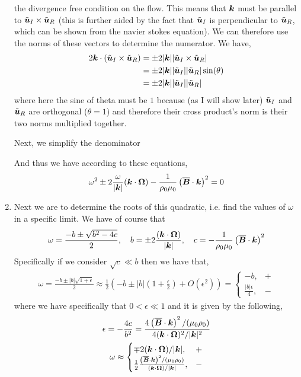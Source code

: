 \documentclass{article}
\begin{document}
\begin{enumerate}[label=\alph*.)]
    the divergence free condition on the flow. This means that $\boldsymbol{k}$ must be
    parallel to $\tilde{\boldsymbol{u}}_I\times\tilde{\boldsymbol{u}}_R$ (this is further aided by the fact that
    $\tilde{\boldsymbol{u}}_I$ is perpendicular to $\tilde{\boldsymbol{u}}_R$, which can be shown from the navier
    stokes equation). We can therefore use the norms of these vectors to
    determine the numerator. We have, 
    \begin{align*}
        2\boldsymbol{k}\cdot(\tilde{\boldsymbol{u}}_I\times\tilde{\boldsymbol{u}}_R) &= \pm 2|\boldsymbol{k}||\tilde{\boldsymbol{u}}_I\times\tilde{\boldsymbol{u}}_R|\\
        &= \pm2|\boldsymbol{k}||\tilde{\boldsymbol{u}}_I||\tilde{\boldsymbol{u}}_R|\sin(\theta)\\
        &= \pm2|\boldsymbol{k}||\tilde{\boldsymbol{u}}_I||\tilde{\boldsymbol{u}}_R|
    \end{align*}
    where here the sine of theta must be $1$ because (as I will show later)
    $\tilde{\boldsymbol{u}}_I$ and $\tilde{\boldsymbol{u}}_R$ are orthogonal ($\theta = 1$) and therefore their cross
    product's norm is their two norms multiplied together. 
    
    Next, we simplify the denominator

    And thus we have according to these equations, 
    \begin{gather*}
        \omega^2 \pm 2\frac{\omega}{|\boldsymbol{k}|}(\boldsymbol{k}\cdot\boldsymbol{\Omega}) 
        - \frac{1}{\rho_0\mu_0}\left(\overline{\boldsymbol{B}}\cdot\boldsymbol{k}\right)^2
        = 0
    \end{gather*}

    \item Next we are to determine the roots of this quadratic, i.e. find the
    values of $\omega$ in a specific limit. We have of course that 
    \begin{gather*}
        \omega = \frac{-b \pm \sqrt{b^2 - 4c}}{2}, \quad b = \pm
        2\frac{(\boldsymbol{k}\cdot\boldsymbol{\Omega})}{|\boldsymbol{k}|}, \quad c = -\frac{1}{\rho_0\mu_0}\left(\overline{\boldsymbol{B}}\cdot\boldsymbol{k}\right)^2
    \end{gather*}
    Specifically if we consider $\sqrt{c} \ll b$ then we have that,
    \begin{gather*}
        \omega = \frac{-b \pm |b|\sqrt{1 + \epsilon}}{2} \approx
        \frac{1}{2}\left(-b \pm |b|\left(1 + \frac{\epsilon}{2}\right) +
        O(\epsilon^2)\right) =  \begin{cases} -b, & +\\
        \frac{|b|\epsilon}{4}, & -
        \end{cases}
    \end{gather*}
    where we have specifically that $0<\epsilon \ll 1$ and it is given by the
    following, 
    \begin{gather*}
        \epsilon = -\frac{4c}{b^2} =
        \frac{4\left(\overline{\boldsymbol{B}}\cdot\boldsymbol{k}\right)^2/(\mu_0\rho_0)}{4(\boldsymbol{k}\cdot\boldsymbol{\Omega})^2/|\boldsymbol{k}|^2}\\
        \omega \approx  \begin{cases} \mp2(\boldsymbol{k}\cdot\boldsymbol{\Omega})/|\boldsymbol{k}|, & +\\
        \frac{1}{2}\frac{\left(\overline{\boldsymbol{B}}\cdot\boldsymbol{k}\right)^2/(\mu_0\rho_0)}{(\boldsymbol{k}\cdot\boldsymbol{\Omega})/|\boldsymbol{k}|}, & -
        \end{cases}
    \end{gather*}
\end{enumerate}
\end{document}
